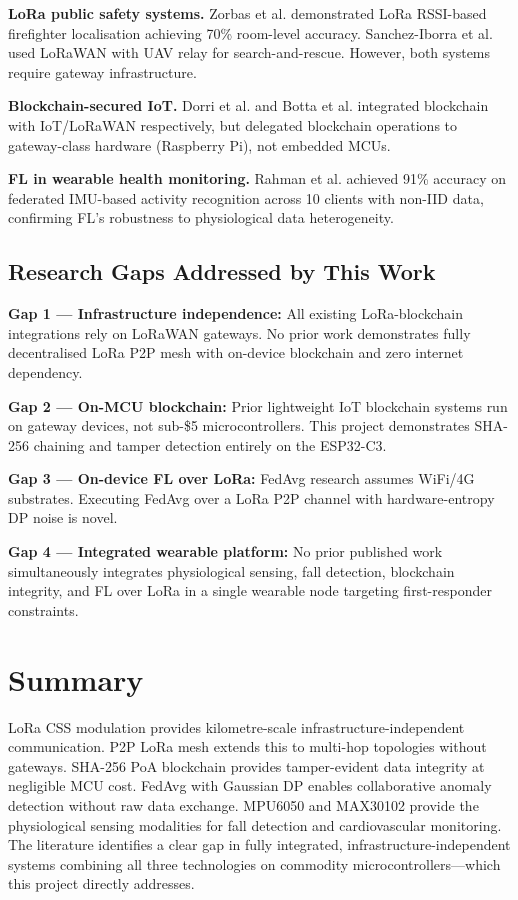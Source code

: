 \textbf{LoRa public safety systems.} Zorbas et al. \cite{Zorbas2020} demonstrated LoRa RSSI-based firefighter localisation achieving 70\% room-level accuracy. Sanchez-Iborra et al. \cite{SanchezIborra2018} used LoRaWAN with UAV relay for search-and-rescue. However, both systems require gateway infrastructure.

\textbf{Blockchain-secured IoT.} Dorri et al. \cite{Dorri2017} and Botta et al. \cite{Botta2021} integrated blockchain with IoT/LoRaWAN respectively, but delegated blockchain operations to gateway-class hardware (Raspberry Pi), not embedded MCUs.

\textbf{FL in wearable health monitoring.} Rahman et al. \cite{Rahman2021} achieved 91\% accuracy on federated IMU-based activity recognition across 10 clients with non-IID data, confirming FL's robustness to physiological data heterogeneity.

\subsection{Research Gaps Addressed by This Work}

\textbf{Gap 1 — Infrastructure independence:} All existing LoRa-blockchain integrations rely on LoRaWAN gateways. No prior work demonstrates fully decentralised LoRa P2P mesh with on-device blockchain and zero internet dependency.

\textbf{Gap 2 — On-MCU blockchain:} Prior lightweight IoT blockchain systems run on gateway devices, not sub-\$5 microcontrollers. This project demonstrates SHA-256 chaining and tamper detection entirely on the ESP32-C3.

\textbf{Gap 3 — On-device FL over LoRa:} FedAvg research assumes WiFi/4G substrates. Executing FedAvg over a LoRa P2P channel with hardware-entropy DP noise is novel.

\textbf{Gap 4 — Integrated wearable platform:} No prior published work simultaneously integrates physiological sensing, fall detection, blockchain integrity, and FL over LoRa in a single wearable node targeting first-responder constraints.

\section{Summary}

LoRa CSS modulation provides kilometre-scale infrastructure-independent communication. P2P LoRa mesh extends this to multi-hop topologies without gateways. SHA-256 PoA blockchain provides tamper-evident data integrity at negligible MCU cost. FedAvg with Gaussian DP enables collaborative anomaly detection without raw data exchange. MPU6050 and MAX30102 provide the physiological sensing modalities for fall detection and cardiovascular monitoring. The literature identifies a clear gap in fully integrated, infrastructure-independent systems combining all three technologies on commodity microcontrollers—which this project directly addresses.
